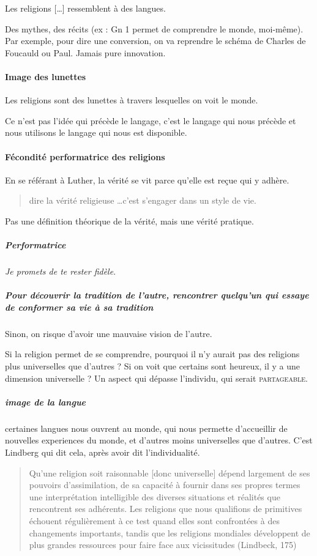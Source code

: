  \begin{Def}
  Les religions […] ressemblent à des langues.
  \end{Def}
  
  Des mythes, des récits (ex : Gn 1 permet de comprendre le monde, moi-même). Par exemple, pour dire une conversion, on va reprendre le schéma de Charles de Foucauld ou Paul. Jamais pure innovation.
  \paragraph{Image des lunettes} Les religions sont des lunettes à travers lesquelles on voit le monde. 
  
  Ce n'est pas l'idée qui précède le langage, c'est le langage qui nous précède et nous utilisons le langage qui nous est disponible. 
  
  \paragraph{Fécondité performatrice des religions}
  En se référant à Luther, la vérité se vit parce qu'elle est reçue qui y adhère. 
  
  

\begin{quote}
    dire la vérité religieuse \ldots c'est s'engager dans un style de vie.
\end{quote}
 Pas une définition théorique de la vérité, mais une vérité pratique.
  
  \subparagraph{Performatrice} \textit{Je promets de te rester fidèle}. 
  
  \subparagraph{Pour découvrir la tradition de l'autre, rencontrer quelqu'un qui essaye de conformer sa vie à sa tradition} Sinon, on risque d'avoir une mauvaise vision de l'autre.
  
  
  
  Si la religion permet de se comprendre, pourquoi il n'y aurait pas des religions plus universelles que d'autres ? Si on voit que certains sont heureux, il y a une dimension universelle ? Un aspect qui dépasse l'individu, qui serait \textsc{partageable}.
  
  \subparagraph{image de la langue} certaines langues nous ouvrent au monde, qui nous permette d'accueillir de nouvelles experiences du monde, et d'autres moins universelles que d'autres. C'est Lindberg qui dit cela, après avoir dit l'individualité.
  
  \begin{quote}
      Qu’une religion soit raisonnable [donc universelle] dépend largement de ses pouvoirs d’assimilation, de sa capacité à fournir dans ses propres termes une interprétation intelligible des diverses situations et réalités que rencontrent ses adhérents. Les religions que nous qualifions de primitives échouent régulièrement à ce test quand elles sont confrontées à des changements importants, tandis que les religions mondiales développent de plus grandes ressources pour faire face aux vicissitudes (Lindbeck, 175)
  \end{quote}
  

